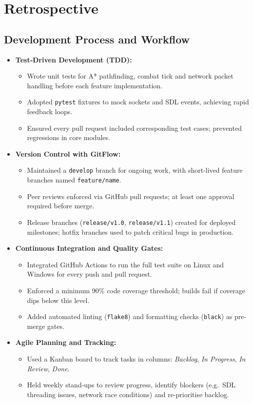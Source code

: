 \documentclass[11pt,a4paper]{article}
\begin{document}
\section{Retrospective}
\subsection{Development Process and Workflow}
\begin{itemize}[nosep]
  \item \textbf{Test‐Driven Development (TDD):}  
    \begin{itemize}[nosep]
      \item Wrote unit tests for A* pathfinding, combat tick and network packet handling before each feature implementation.  
      \item Adopted \texttt{pytest} fixtures to mock sockets and SDL events, achieving rapid feedback loops.  
      \item Ensured every pull request included corresponding test cases; prevented regressions in core modules.
    \end{itemize}

  \item \textbf{Version Control with GitFlow:}  
    \begin{itemize}[nosep]
      \item Maintained a \texttt{develop} branch for ongoing work, with short‐lived feature branches named \texttt{feature/name}.  
      \item Peer reviews enforced via GitHub pull requests; at least one approval required before merge.  
      \item Release branches (\texttt{release/v1.0}, \texttt{release/v1.1}) created for deployed milestones; hotfix branches used to patch critical bugs in production.
    \end{itemize}

  \item \textbf{Continuous Integration and Quality Gates:}  
    \begin{itemize}[nosep]
      \item Integrated GitHub Actions to run the full test suite on Linux and Windows for every push and pull request.  
      \item Enforced a minimum 90\% code coverage threshold; builds fail if coverage dips below this level.  
      \item Added automated linting (\texttt{flake8}) and formatting checks (\texttt{black}) as pre‐merge gates.
    \end{itemize}

  \item \textbf{Agile Planning and Tracking:}  
    \begin{itemize}[nosep]
      \item Used a Kanban board to track tasks in columns: \emph{Backlog}, \emph{In Progress}, \emph{In Review}, \emph{Done}.  
      \item Held weekly stand‐ups to review progress, identify blockers (e.g.\ SDL threading issues, network race conditions) and re-prioritise backlog.
    \end{itemize}
\end{itemize}
\end{document}
